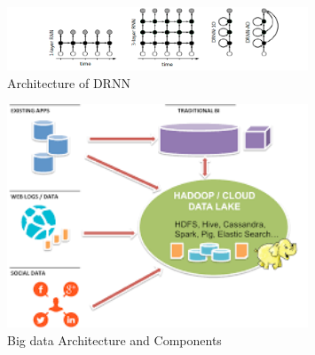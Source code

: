 \documentclass[sigconf]{acmart}
\begin{document}
\begin{figure}[htp]
    \includegraphics[width=0.8\textwidth]{images/images2.jpg}
    \caption{Architecture of DRNN}
    \label{fig:figure3}
\end{figure}

\begin{figure}[htp]
    \includegraphics[width=0.8\textwidth]{images/images3.jpg}
    \caption{Big data Architecture and Components \cite{www-google}}
    \label{fig:figure4}
\end{figure}


\end{document}

